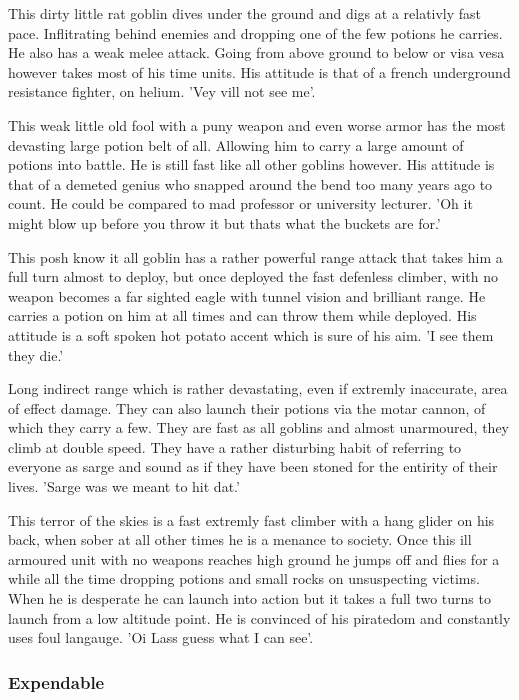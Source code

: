 \documentclass[a4paper,twocolumn]{article}
\begin{document}
This dirty little rat goblin dives under the ground and digs at a relativly fast pace. Inflitrating behind enemies and dropping one of the few potions he carries. He also has a weak melee attack. Going from above ground to below or visa vesa however takes most of his time units. His attitude is that of a french underground resistance fighter, on helium. 'Vey vill not see me'.

This weak little old fool with a puny weapon and even worse armor has the most devasting large potion belt of all. Allowing him to carry a large amount of potions into battle. He is still fast like all other goblins however. His attitude is that of a demeted genius who snapped around the bend too many years ago to count. He could be compared to mad professor or university lecturer. 'Oh it might blow up before you throw it but thats what the buckets are for.'

This posh know it all goblin has a rather powerful range attack that takes him a full turn almost to deploy, but once deployed the fast defenless climber, with no weapon becomes a far sighted eagle with tunnel vision and brilliant range. He carries a potion on him at all times and can throw them while deployed. His attitude is a soft spoken hot potato accent which is sure of his aim. 'I see them they die.'

Long indirect range which is rather devastating, even if extremly inaccurate, area of effect damage. They can also launch their potions via the motar cannon, of which they carry a few. They are fast as all goblins and almost unarmoured, they climb at double speed. They have a rather disturbing habit of referring to everyone as sarge and sound as if they have been stoned for the entirity of their lives. 'Sarge was we meant to hit dat.'

This terror of the skies is a fast extremly fast climber with a hang glider on his back, when sober at all other times he is a menance to society. Once this ill armoured unit with no weapons reaches high ground he jumps off and flies for a while all the time dropping potions and small rocks on unsuspecting victims. When he is desperate he can launch into action but it takes a full two turns to launch from a low altitude point. He is convinced of his piratedom and constantly uses foul langauge. 'Oi Lass guess what I can see'.

\subsubsection{Expendable}
\end{document}
